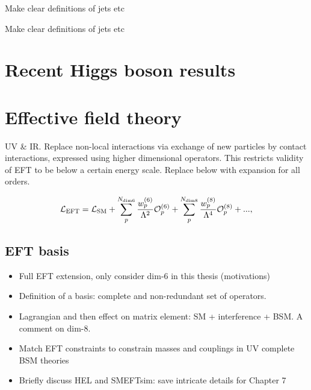 \begin{table}[htb!]
    \caption[VH leptonic STXS stage 1.2 definitions and fractions]{Make clear definitions of jets etc}
    \label{tab:vh_definitions}
    \centering
    \scriptsize
    \renewcommand{\arraystretch}{1.2}
    \setlength{\tabcolsep}{5pt}
    \hspace*{-5cm}
    
    \hspace*{-5cm}
\end{table}

\begin{table}[htb!]
    \caption[Top-associated and bbH STXS stage 1.2 definitions and fractions]{Make clear definitions of jets etc}
    \label{tab:top_definitions}
    \centering
    \scriptsize
    \renewcommand{\arraystretch}{1.5}
    \setlength{\tabcolsep}{5pt}
    \hspace*{-5cm}
    
    \hspace*{-5cm}
\end{table}

\section{Recent Higgs boson results}

\section{Effective field theory}\label{sec:theory_eft}

UV & IR. Replace non-local interactions via exchange of new particles by contact interactions, expressed using higher dimensional operators. This restricts validity of EFT to be below a certain energy scale. Replace below with expansion for all orders.

\begin{equation}\label{eq:eft_expansion}
    \mathcal{L}_{\rm{EFT}} = \mathcal{L}_{\rm{SM}} + \sum^{N_{\rm{dim6}}}_p \frac{w^{(6)}_p}{\Lambda^2}\mathcal{O}^{(6)}_p + \sum^{N_{\rm{dim8}}}_p \frac{w^{(8)}_p}{\Lambda^4}\mathcal{O}^{(8)}_p + ... ,
\end{equation}

\subsection{EFT basis}
\begin{itemize}
    \item Full EFT extension, only consider dim-6 in this thesis (motivations)
    \item Definition of a basis: complete and non-redundant set of operators.
    \item Lagrangian and then effect on matrix element: SM + interference + BSM. A comment on dim-8.
    \item Match EFT constraints to constrain masses and couplings in UV complete BSM theories
    \item Briefly discuss HEL and SMEFTsim: save intricate details for Chapter 7
\end{itemize}